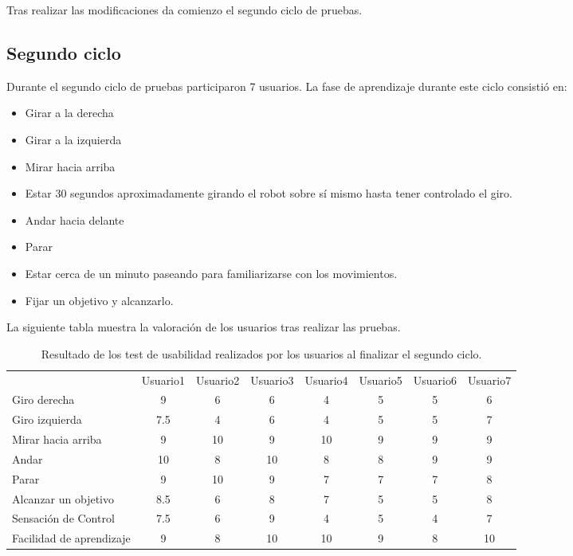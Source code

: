 \documentclass[twoside, 11pt]{epstfg}
\begin{document}
Tras realizar las modificaciones da comienzo el segundo ciclo de pruebas.

\subsection{Segundo ciclo}

Durante el segundo ciclo de pruebas participaron 7 usuarios.
La fase de aprendizaje durante este ciclo consistió en:

\begin{itemize}
	\item Girar a la derecha
	\item Girar a la izquierda
	\item Mirar hacia arriba
	\item Estar 30 segundos aproximadamente girando el robot sobre sí mismo hasta tener controlado el giro.
	\item Andar hacia delante
	\item Parar
	\item Estar cerca de un minuto paseando para familiarizarse con los movimientos.
	\item Fijar un objetivo y alcanzarlo.
\end{itemize}

La siguiente tabla muestra la valoración de los usuarios tras realizar las pruebas.
\begin{center}
\begin{table}[h!]
\small

\begin{tabular}{|g  c  c  c  c  c  c  c |}
		\hline
	 \\ \hline
	& Usuario1 & Usuario2 & Usuario3 & Usuario4 & Usuario5 & Usuario6 & Usuario7\\
	 
	Giro derecha & 9 & 6 & 6 & 4 & 5 & 5 & 6\\
	Giro izquierda & 7.5 & 4 & 6 & 4 & 5 & 5 & 7\\
	Mirar hacia arriba & 9 & 10 & 9 & 10 & 9 & 9 & 9\\
	Andar & 10 & 8 & 10 & 8 & 8 & 9 & 9\\
	Parar & 9 & 10 & 9 & 7 & 7 & 7 & 8\\
	Alcanzar un objetivo & 8.5 & 6 & 8 & 7 & 5 & 5 & 8\\
	Sensación de Control & 7.5 & 6 & 9 & 4 & 5 & 4 & 7\\
	Facilidad de aprendizaje & 9 & 8 & 10 & 10 & 9 & 8 & 10\\
	\hline
\end{tabular}
\caption{Resultado de los test de usabilidad realizados por los usuarios al finalizar el segundo ciclo.}
\end{table}
\end{center}
\end{document}

